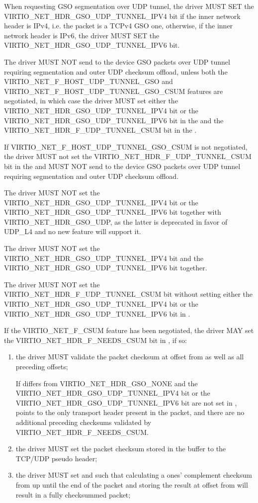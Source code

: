 When requesting GSO segmentation over UDP tunnel, the driver MUST SET the
VIRTIO_NET_HDR_GSO_UDP_TUNNEL_IPV4 bit if the inner network header is IPv4, i.e. the
packet is a TCPv4 GSO one, otherwise, if the inner network header is IPv6, the driver
MUST SET the VIRTIO_NET_HDR_GSO_UDP_TUNNEL_IPV6 bit.

The driver MUST NOT send to the device GSO packets over UDP tunnel
requiring segmentation and outer UDP checksum offload, unless both the
VIRTIO_NET_F_HOST_UDP_TUNNEL_GSO and VIRTIO_NET_F_HOST_UDP_TUNNEL_GSO_CSUM features
are negotiated, in which case the driver MUST set either the
VIRTIO_NET_HDR_GSO_UDP_TUNNEL_IPV4 bit or the VIRTIO_NET_HDR_GSO_UDP_TUNNEL_IPV6
bit in the  and the VIRTIO_NET_HDR_F_UDP_TUNNEL_CSUM bit in
the .

If VIRTIO_NET_F_HOST_UDP_TUNNEL_GSO_CSUM is not negotiated, the driver MUST not set
the VIRTIO_NET_HDR_F_UDP_TUNNEL_CSUM bit in the  and
MUST NOT send to the device GSO packets over UDP tunnel
requiring segmentation and outer UDP checksum offload.

The driver MUST NOT set the VIRTIO_NET_HDR_GSO_UDP_TUNNEL_IPV4 bit or the
VIRTIO_NET_HDR_GSO_UDP_TUNNEL_IPV6 bit together with VIRTIO_NET_HDR_GSO_UDP, as the
latter is deprecated in favor of UDP_L4 and no new feature will support it.

The driver MUST NOT set the VIRTIO_NET_HDR_GSO_UDP_TUNNEL_IPV4 bit and the
VIRTIO_NET_HDR_GSO_UDP_TUNNEL_IPV6 bit together.

The driver MUST NOT set the VIRTIO_NET_HDR_F_UDP_TUNNEL_CSUM bit 
without setting either the VIRTIO_NET_HDR_GSO_UDP_TUNNEL_IPV4 bit or
the VIRTIO_NET_HDR_GSO_UDP_TUNNEL_IPV6 bit in .

If the VIRTIO_NET_F_CSUM feature has been negotiated, the
driver MAY set the VIRTIO_NET_HDR_F_NEEDS_CSUM bit in
, if so:
\begin{enumerate}
\item the driver MUST validate the packet checksum at
	offset  from  as well as all
	preceding offsets;
\begin{note}
If  differs from VIRTIO_NET_HDR_GSO_NONE and the
VIRTIO_NET_HDR_GSO_UDP_TUNNEL_IPV4 bit or the VIRTIO_NET_HDR_GSO_UDP_TUNNEL_IPV6
bit are not set in , 
points to the only transport header present in the packet, and there are no
additional preceding checksums validated by VIRTIO_NET_HDR_F_NEEDS_CSUM.
\end{note}
\item the driver MUST set the packet checksum stored in the
	buffer to the TCP/UDP pseudo header;
\item the driver MUST set  and
	 such that calculating a ones'
	complement checksum from  up until the end of
	the packet and storing the result at offset 
	from   will result in a fully checksummed
	packet;
\end{enumerate}

